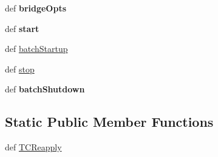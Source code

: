 \begin{DoxyCompactItemize}
\item 
\hypertarget{classmininet_1_1node_1_1OVSSwitch_af82b359e514f8e4604958152c3b81f60}{def {\bfseries bridge\-Opts}}\label{classmininet_1_1node_1_1OVSSwitch_af82b359e514f8e4604958152c3b81f60}

\item 
\hypertarget{classmininet_1_1node_1_1OVSSwitch_a64175be004c3bca8217799640b168d41}{def {\bfseries start}}\label{classmininet_1_1node_1_1OVSSwitch_a64175be004c3bca8217799640b168d41}

\item 
def \hyperlink{classmininet_1_1node_1_1OVSSwitch_ac68c5ffcb307298b105cf664b8b170e6}{batch\-Startup}
\item 
def \hyperlink{classmininet_1_1node_1_1OVSSwitch_a738aa9dc6c54527fee71f09aea9da8aa}{stop}
\item 
\hypertarget{classmininet_1_1node_1_1OVSSwitch_a2ab791e35f567b35a92c03dd9c89389d}{def {\bfseries batch\-Shutdown}}\label{classmininet_1_1node_1_1OVSSwitch_a2ab791e35f567b35a92c03dd9c89389d}

\end{DoxyCompactItemize}
\subsection*{Static Public Member Functions}
\begin{DoxyCompactItemize}
\item 
def \hyperlink{classmininet_1_1node_1_1OVSSwitch_a91f455741115c89f17d428cd8c22f284}{T\-C\-Reapply}
\end{DoxyCompactItemize}
